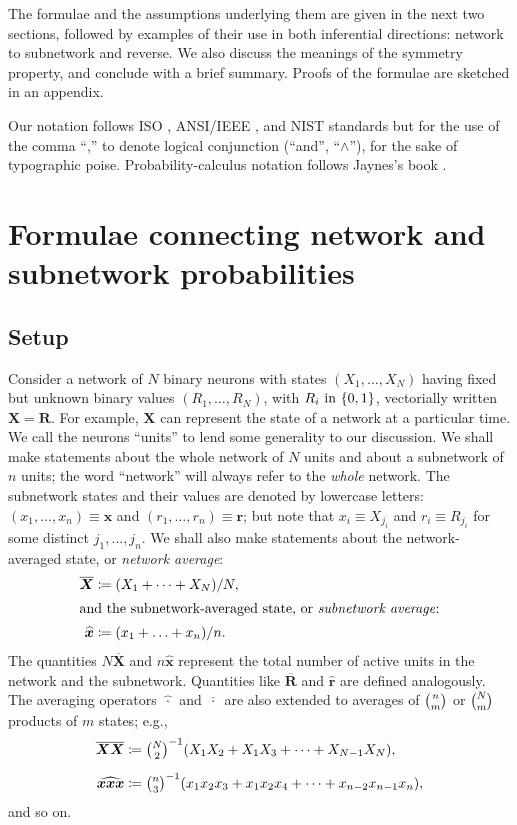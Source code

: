 \documentclass{article}
\newcommand*{\citep}{\parencites}
\theoremstyle{innote}
\newcommand*{\av}{\overline} %
\newcommand*{\sav}{\widehat} %
\newcommand*{\yx}{\bm{x}}%
\newcommand*{\yxs}{\sav{\yx}}%
\newcommand*{\yX}{\bm{X}}%
\newcommand*{\yXf}{\av{\yX}}%
\newcommand*{\yr}{\bm{r}}%
\newcommand*{\yrs}{\sav{\yr}}%
\newcommand*{\yR}{\bm{R}}%
\newcommand*{\yRf}{\av{\yR}}%
\DeclarePairedDelimiter\set{\{}{\}}
\newcommand*{\eg}{{e.g.}}
\newcommand*{\defd}{\coloneqq}
\newcommand*{\dotv}{\mathord{\,\cdot\,}}%
\renewcommand*{\|}{\cond}
\newcommand*{\+}{\lor}
\begin{document}
The formulae and the assumptions underlying them are given in the next two
sections, followed by examples of their use in both inferential directions:
network to subnetwork and reverse. We also discuss the meanings of the
symmetry property, and conclude with a brief summary. Proofs of the
formulae are sketched in an appendix.

Our notation follows ISO \citep{iso1993}, ANSI/IEEE \citep{ieee1993}, and
NIST \citep{nist1995} standards but for the use of the comma \enquote{,} to
denote logical conjunction (\enquote{and}, \enquote{$\land$}), for the sake
of typographic poise. %
Probability-calculus notation follows Jaynes's book \citep{jaynes1994_r2003}.

\section{Formulae connecting network and subnetwork probabilities}
\label{sec:setup_assumptions}

\subsection{Setup}
\label{sec:setup}

Consider a network of $N$ binary neurons with states $(X_1,\dotsc,X_N)$
having fixed but unknown binary values $(R_1,\dotsc,R_N)$, with
$R_i \text{ in } \set{0,1}$, vectorially written $\yX=\yR$. For example,
$\yX$ can represent the state of a network at a particular time. We call
the neurons \enquote{units} to lend some generality to our discussion. We
shall make statements about the whole network of $N$ units and about a
subnetwork of $n$ units; the word \enquote{network} will always refer to
the \emph{whole} network. The subnetwork states and their values are
denoted by lowercase letters: $(x_1, \dotsc, x_n)\equiv\yx$ and
$(r_1, \dotsc, r_n)\equiv\yr$; but note that $x_i \equiv X_{j_i}$ and
$r_i \equiv R_{j_i}$ for some distinct $j_1,\dotsc,j_n$. We shall also make
statements about the network-averaged state, or \emph{network average}:
\begin{align}
  \label{eq:network-av}
   \yXf &\defd (X_1 + \dotsb + X_N)/N,
\\
\intertext{and the subnetwork-averaged state, or \emph{subnetwork average}:}
\label{eq:subnetwork-av}
\yxs &\defd (x_1 + \dotsc + x_n)/n.
\end{align}
The quantities $N\yXf$ and $n\yxs$ represent the total number of active
units in the network and the subnetwork. Quantities like $\yRf$ and $\yrs$
are defined analogously. The averaging operators $\sav{\dotv}$ and
$\av{\dotv}$ are also extended to averages of $\tbinom{n}{m}$ or
$\tbinom{N}{m}$ products of $m$ states; \eg,
\begin{align}
\av{\yX \yX} &\defd
\tbinom{N}{2}^{-1} (X_1 X_2 + X_1 X_3  + \dotsb +  X_{N-1} X_N),
\\[2\jot]
\sav{\yx\yx\yx} &\defd
\tbinom{n}{3}^{-1} (x_1 x_2 x_3 + x_1 x_2 x_4 + \dotsb + x_{n-2} x_{n-1} x_n),
\end{align}
and so on.
\end{document}
